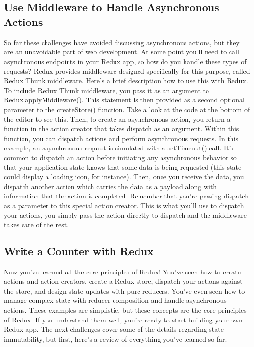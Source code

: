 \documentclass{article}%
\begin{document}
%
\subsection{Use Middleware to Handle Asynchronous Actions}%
\label{subsec:UseMiddlewaretoHandleAsynchronousActions}%
So far these challenges have avoided discussing asynchronous actions, but they are an unavoidable part of web development. At some point you'll need to call asynchronous endpoints in your Redux app, so how do you handle these types of requests? Redux provides middleware designed specifically for this purpose, called Redux Thunk middleware. Here's a brief description how to use this with Redux.\newline%
To include Redux Thunk middleware, you pass it as an argument to Redux.applyMiddleware(). This statement is then provided as a second optional parameter to the createStore() function. Take a look at the code at the bottom of the editor to see this. Then, to create an asynchronous action, you return a function in the action creator that takes dispatch as an argument. Within this function, you can dispatch actions and perform asynchronous requests.\newline%
In this example, an asynchronous request is simulated with a setTimeout() call. It's common to dispatch an action before initiating any asynchronous behavior so that your application state knows that some data is being requested (this state could display a loading icon, for instance). Then, once you receive the data, you dispatch another action which carries the data as a payload along with information that the action is completed.\newline%
Remember that you're passing dispatch as a parameter to this special action creator. This is what you'll use to dispatch your actions, you simply pass the action directly to dispatch and the middleware takes care of the rest.\newline%

%
\subsection{Write a Counter with Redux}%
\label{subsec:WriteaCounterwithRedux}%
Now you've learned all the core principles of Redux! You've seen how to create actions and action creators, create a Redux store, dispatch your actions against the store, and design state updates with pure reducers. You've even seen how to manage complex state with reducer composition and handle asynchronous actions. These examples are simplistic, but these concepts are the core principles of Redux. If you understand them well, you're ready to start building your own Redux app. The next challenges cover some of the details regarding state immutability, but first, here's a review of everything you've learned so far.\newline%
\end{document}
